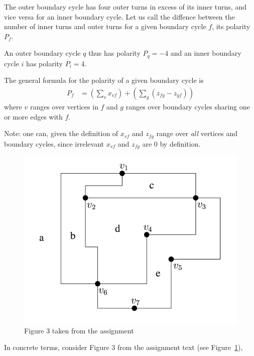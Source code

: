 The outer boundary cycle has four outer turns in excess of its inner turns, and vice
versa for an inner boundary cycle. Let us call the diffence between the number of inner turns 
and outer turns for a given boundary cycle $f$, its polarity $P_f$.

An outer boundary cycle $q$ thus has polarity $P_q = -4$ and an inner boundary cycle $i$ has polarity $P_i = 4$.

The general formula for the polarity of a given boundary cycle is
\begin{align*}
  P_f &= \left(\sum_v x_{vf}\right) + \left(\sum_g ( z_{fg} - z_{gf} ) \right)
\end{align*}
where $v$ ranges over vertices in $f$ and $g$ ranges over boundary cycles sharing one or more edges
with $f$.

Note: one can, given the definition of $x_{vf}$ and $z_{fg}$ range over \emph{all} vertices and 
boundary cycles, since irrelevant $x_{vf}$ and $z_{fg}$ are $0$ by definition.

\begin{figure}
  \label{fig:rect-layout}
  \begin{center}
    \includegraphics[scale=0.5]{img/fig3.png}
  \end{center}
  \caption{Figure 3 taken from the assignment}
\end{figure}

In concrete terms, consider Figure 3 from the assignment text (see Figure~\ref{fig:rect-layout}),

